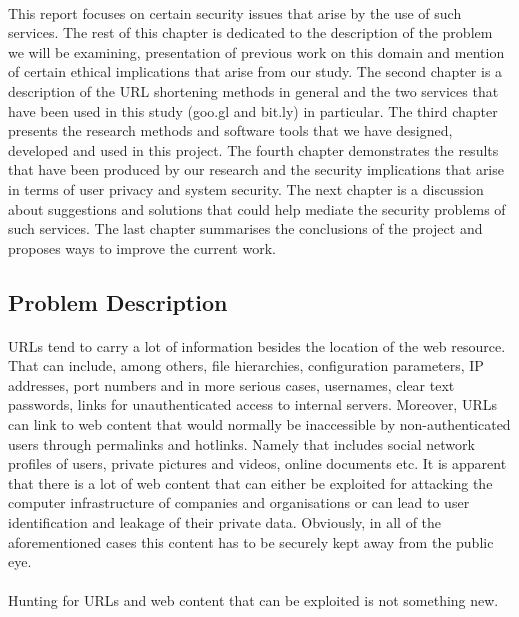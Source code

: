 \documentclass[12pt]{article}
\begin{document}
\paragraph{}
This report focuses on certain security issues that arise by the use of such services. The rest of this chapter is dedicated to the description of the problem we will be examining, presentation of previous work on this domain and mention of certain ethical implications that arise from our study. The second chapter is a description of the URL shortening methods in general and the two services that have been used in this study (goo.gl and bit.ly) in particular. The third chapter presents the research methods and software tools that we have designed, developed and used in this project. The fourth chapter demonstrates the results that have been produced by our research and the security implications that arise in terms of user privacy and system security. The next chapter is a discussion about suggestions and solutions that could help mediate the security problems of such services. The last chapter summarises the conclusions of the project and proposes ways to improve the current work. 
\newpage
\subsection{Problem Description}

\paragraph{}
URLs tend to carry a lot of information besides the location of the web resource. That can include, among others, file hierarchies, configuration parameters, IP addresses, port numbers and in more serious cases, usernames, clear text passwords, links for unauthenticated access to internal servers. Moreover, URLs can link to web content that would normally be inaccessible by non-authenticated users through permalinks and hotlinks. Namely that includes social network profiles of users, private pictures and videos, online documents etc. It is apparent that there is a lot of web content that can either be exploited for attacking the computer infrastructure of companies and organisations or can lead to user identification and leakage of their private data. Obviously, in all of the aforementioned cases this content has to be securely kept away from the public eye.
\paragraph{}
Hunting for URLs and web content that can be exploited is not something new. 
\end{document}

